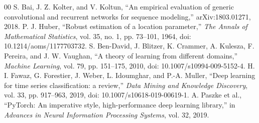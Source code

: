 \documentclass[conference]{IEEEtran}
\begin{document}
\begin{thebibliography}{00}
 S. Bai, J. Z. Kolter, and V. Koltun, ``An empirical evaluation of generic convolutional and recurrent networks for sequence modeling,'' arXiv:1803.01271, 2018.
 P. J. Huber, ``Robust estimation of a location parameter,'' \emph{The Annals of Mathematical Statistics}, vol. 35, no. 1, pp. 73--101, 1964, doi: 10.1214/aoms/1177703732.
 S. Ben-David, J. Blitzer, K. Crammer, A. Kulesza, F. Pereira, and J. W. Vaughan, ``A theory of learning from different domains,'' \emph{Machine Learning}, vol. 79, pp. 151--175, 2010, doi: 10.1007/s10994-009-5152-4.
 H. I. Fawaz, G. Forestier, J. Weber, L. Idoumghar, and P.-A. Muller, ``Deep learning for time series classification: a review,'' \emph{Data Mining and Knowledge Discovery}, vol. 33, pp. 917--963, 2019, doi: 10.1007/s10618-019-00619-1.
 A. Paszke et al., ``PyTorch: An imperative style, high-performance deep learning library,'' in \emph{Advances in Neural Information Processing Systems}, vol. 32, 2019.
\end{thebibliography}
\end{document}

